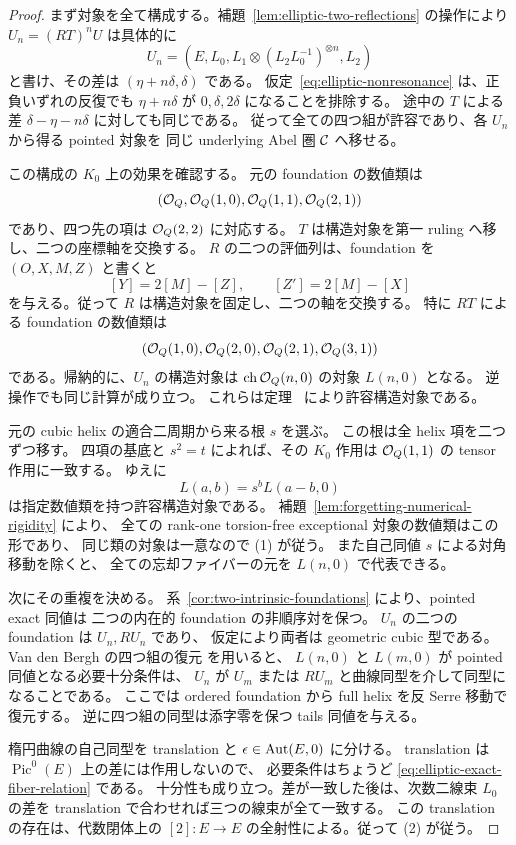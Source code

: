 \begin{proof}
まず対象を全て構成する。補題~\ref{lem:elliptic-two-reflections} の操作により
$U_n=(RT)^nU$ は具体的に
\[
 U_n=(E,L_0,L_1\otimes(L_2L_0^{-1})^{\otimes n},L_2)
\]
と書け、その差は $(\eta+n\delta,\delta)$ である。
仮定~\eqref{eq:elliptic-nonresonance} は、正負いずれの反復でも
$\eta+n\delta$ が $0,\delta,2\delta$ になることを排除する。
途中の $T$ による差 $\delta-\eta-n\delta$ に対しても同じである。
従って全ての四つ組が許容であり、各 $U_n$ から得る pointed 対象を
同じ underlying Abel 圏 $\mathcal C$ へ移せる。

この構成の $K_0$ 上の効果を確認する。
元の foundation の数値類は
\[
 (\mathcal O_Q,\mathcal O_Q(1,0),\mathcal O_Q(1,1),\mathcal O_Q(2,1))
\]
であり、四つ先の項は $\mathcal O_Q(2,2)$ に対応する。
$T$ は構造対象を第一 ruling へ移し、二つの座標軸を交換する。
$R$ の二つの評価列は、foundation を $(O,X,M,Z)$ と書くと
\[
 [Y]=2[M]-[Z],\qquad [Z']=2[M]-[X]
\]
を与える。従って $R$ は構造対象を固定し、二つの軸を交換する。
特に $RT$ による foundation の数値類は
\[
 (\mathcal O_Q(1,0),\mathcal O_Q(2,0),\mathcal O_Q(2,1),\mathcal O_Q(3,1))
\]
である。帰納的に、$U_n$ の構造対象は
$\operatorname{ch}\mathcal O_Q(n,0)$ の対象 $L(n,0)$ となる。
逆操作でも同じ計算が成り立つ。
これらは定理~\cite[\texttt{thm:all-admissible-inverse}]{QuadricIntrinsic2026} により許容構造対象である。

元の cubic helix の適合二周期から来る根 $s$ を選ぶ。
この根は全 helix 項を二つずつ移す。
四項の基底と $s^2=t$ によれば、その $K_0$ 作用は
$\mathcal O_Q(1,1)$ の tensor 作用に一致する。
ゆえに
\[
 L(a,b)=s^b L(a-b,0)
\]
は指定数値類を持つ許容構造対象である。
補題~\ref{lem:forgetting-numerical-rigidity} により、
全ての rank-one torsion-free exceptional 対象の数値類はこの形であり、
同じ類の対象は一意なので (1) が従う。
また自己同値 $s$ による対角移動を除くと、
全ての忘却ファイバーの元を $L(n,0)$ で代表できる。

次にその重複を決める。
系~\ref{cor:two-intrinsic-foundations} により、pointed exact 同値は
二つの内在的 foundation の非順序対を保つ。
$U_n$ の二つの foundation は $U_n,RU_n$ であり、
仮定により両者は geometric cubic 型である。
Van den Bergh の四つ組の復元
\cite[arXiv v3, Theorem 5.5.10]{VdB2011} を用いると、
$L(n,0)$ と $L(m,0)$ が pointed 同値となる必要十分条件は、
$U_n$ が $U_m$ または $RU_m$ と曲線同型を介して同型になることである。
ここでは ordered foundation から full helix を反 Serre 移動で復元する。
逆に四つ組の同型は添字零を保つ tails 同値を与える。

楕円曲線の自己同型を translation と $\epsilon\in\operatorname{Aut}(E,0)$ に分ける。
translation は $\operatorname{Pic}^0(E)$ 上の差には作用しないので、
必要条件はちょうど \eqref{eq:elliptic-exact-fiber-relation} である。
十分性も成り立つ。差が一致した後は、次数二線束 $L_0$ の差を
translation で合わせれば三つの線束が全て一致する。
この translation の存在は、代数閉体上の
$[2]:E\to E$ の全射性による。従って (2) が従う。


\end{proof}
